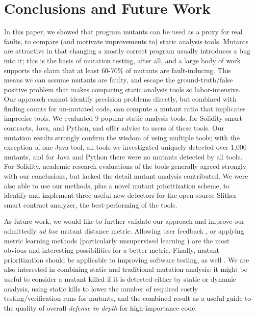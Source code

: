 \section{Conclusions and Future Work}

In this paper, we showed that program mutants can be used as a proxy
for real faults, to compare (and motivate improvements to) static
analysis tools.  Mutants are attractive in that changing a mostly
correct program usually introduces a bug into it; this is the basis of
mutation testing, after all, and a large body of work supports the
claim that at least 60-70\% of mutants are fault-inducing.   This
means we can assume mutants are faulty, and escape the
ground-truth/false positive problem that makes comparing static
analysis tools so labor-intensive.  Our approach cannot identify precision
problems directly, but combined with finding counts for un-mutated
code, can compute a mutant ratio that implicates imprecise tools.  We
evaluated 9 popular static analysis tools, for Solidity smart contracts, Java,
and Python, and offer advice to users of these tools.  Our mutation
results strongly confirm the wisdom of using multiple tools; with the
exception of one Java tool, all tools we investigated uniquely
detected over 1,000 mutants, and for Java and Python there were no
mutants detected by all tools. For Solidity,
academic research evaluations of the tools generally agreed strongly
with our conclusions, but lacked the detail mutant analysis contributed.
We were also able to use our methods, plus a novel mutant prioritization scheme, to
identify and implement three useful new detectors for the open source Slither smart contract
analyzer, the best-performing of the tools.

As future work, we would like to further validate our approach and
improve our admittedly \emph{ad hoc} mutant distance metric.  Allowing
user feedback \cite{EndUserMistake,OnlyOracle}, or applying metric
learning methods \cite{kulis2012metric} (particularly unsupervised
learning \cite{scholkopf1998nonlinear,tipping1999probabilistic}) are
the most obvious and interesting possibilities for a better metric.
Finally, mutant prioritization should be applicable to improving
software testing, as well \cite{groce2018verified}.  We are also interested in combining static and traditional mutation analysis: it might be useful to consider a mutant killed if it is detected either by static or dynamic analysis, using static kills to lower the number of required costly testing/verification runs for mutants, and the combined result as a useful guide to the quality of overall \emph{defense in depth} \cite{antunes2012defending,FC20} for high-importance code.